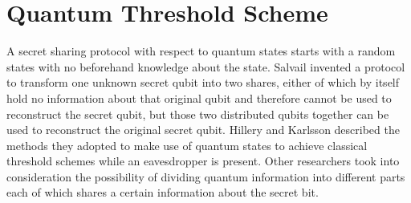 \documentclass[12pt]{article}
\begin{document}
\section{Quantum Threshold Scheme}
    A secret sharing protocol with respect to quantum states starts with a random states with no beforehand knowledge about the state. 
	Salvail\cite{Salvail} invented a protocol to transform one unknown secret qubit into two shares, either of which by itself hold no information about that original qubit and therefore cannot be used to reconstruct the secret qubit, 
	but those two distributed qubits together can be used to reconstruct the original secret qubit.
	Hillery\cite{Hillery} and Karlsson\cite{Karlsson} described the methods they adopted to make use of quantum states to achieve classical threshold schemes while an eavesdropper is present. Other researchers took into consideration the possibility of dividing quantum information into different parts each of which shares a certain information about the secret bit.
\end{document}
